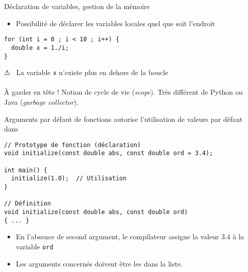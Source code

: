 \documentclass[c]{beamer}
\begin{document}
\begin{frame}[fragile]{Déclaration de variables, gestion de la mémoire}

\begin{itemize}
\item Possibilité de déclarer les variables locales quel que soit l'endroit
\end{itemize}
\begin{verbatim}
for (int i = 0 ; i < 10 ; i++) {
  double x = 1./i;
}
\end{verbatim}

\begin{cbox}[][][\centering]
⚠ \ La variable \texttt{x} n'existe plus en dehors de la boucle\\
\ \\
 À garder en tête ! Notion de cycle de vie (\textit{scope}). Très différent de Python ou Java (\textit{garbage collector}).
\end{cbox}

\end{frame}


\begin{frame}[fragile]{Arguments par défaut de fonctions}
 \Cpp autorise l'utilisation de valeurs par défaut dans 

\begin{verbatim}
// Prototype de fonction (déclaration)
void initialize(const double abs, const double ord = 3.4);

int main() {
  initialize(1.0);  // Utilisation
}

// Définition
void initialize(const double abs, const double ord)
{ ... }
\end{verbatim}

\begin{itemize}
\item En l'absence de second argument, le compilateur assigne la valeur 3.4 à la
variable \texttt{ord}

\item Les arguments concernés doivent  être les  dans la
liste.
\end{itemize}
\end{frame}
\end{document}
